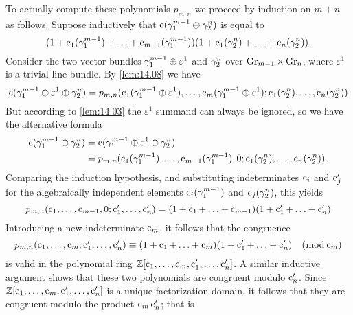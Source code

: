 \documentclass[../main]{subfiles}
\begin{document}
To actually compute these polynomials $p_{m, n}$ we proceed by induction on $m+n$ as follows. Suppose inductively that $\operatorname{c}(\gamma_{1}^{m-1} \oplus \gamma_{2}^{n})$ is equal to
\[
(1+\operatorname{c}_{1}(\gamma_{1}^{m-1})+\ldots+\operatorname{c}_{m-1}(\gamma_{1}^{m-1}))(1+\operatorname{c}_{1}(\gamma_{2}^{n})+\ldots+\operatorname{c}_{n}(\gamma_{2}^{n})) .
\]
Consider the two vector bundles $\gamma_{1}^{m-1} \oplus \varepsilon^{1}$ and $\gamma_{2}^{n}$ over $\operatorname{Gr}_{m-1} \times \operatorname{Gr}_{n}$, where $\varepsilon^{1}$ is a trivial line bundle. By \ref{lem:14.08} we have
\[\operatorname{c}(\gamma_{1}^{m-1} \oplus \varepsilon^{1} \oplus \gamma_{2}^{n})=p_{m, n}(\operatorname{c}_{1}(\gamma_{1}^{m-1} \oplus \varepsilon^{1}), \ldots, \operatorname{c}_{m}(\gamma_{1}^{m-1} \oplus \varepsilon^{1}) ; \operatorname{c}_{1}(\gamma_{2}^{n}), \ldots, \operatorname{c}_{n}(\gamma_{2}^{n}))\]
But according to \ref{lem:14.03} the $\varepsilon^{1}$ summand can always be ignored, so we have the alternative formula
\[
\begin{aligned}
\operatorname{c}(\gamma_{1}^{m-1} \oplus \gamma_{2}^{n}) &=\operatorname{c}(\gamma_{1}^{m-1} \oplus \varepsilon^{1} \oplus \gamma_{2}^{n}) \\
&=p_{m, n}(\operatorname{c}_{1}(\gamma_{1}^{m-1}), \ldots, \operatorname{c}_{m-1}(\gamma_{1}^{m-1}), 0 ; \operatorname{c}_{1}(\gamma_{2}^{n}), \ldots, \operatorname{c}_{n}(\gamma_{2}^{n})) .
\end{aligned}
\]
Comparing the induction hypothesis, and substituting indeterminates $\operatorname{c}_{i}$ and $\operatorname{c}_{j}^{\prime}$ for the algebraically independent elements $\operatorname{c}_{i}(\gamma_{1}^{m-1})$ and $\operatorname{c}_{j}(\gamma_{2}^{n})$, this yields
\[
p_{m, n}(\operatorname{c}_{1}, \ldots, \operatorname{c}_{m-1}, 0 ; \operatorname{c}_{1}^{\prime}, \ldots, \operatorname{c}_{n}^{\prime})=(1+\operatorname{c}_{1}+\ldots+\operatorname{c}_{m-1})(1+\operatorname{c}_{1}^{\prime}+\ldots+\operatorname{c}_{n}^{\prime})
\]
Introducing a new indeterminate $\operatorname{c}_{m}$, it follows that the congruence
\[p_{m, n}(\operatorname{c}_{1}, \ldots, \operatorname{c}_{m} ; \operatorname{c}_{1}^{\prime}, \ldots, \operatorname{c}_{n}^{\prime}) \equiv(1+\operatorname{c}_{1}+\ldots+\operatorname{c}_{m})(1+\operatorname{c}_{1}^{\prime}+\ldots+\operatorname{c}_{n}^{\prime}) \quad(\bmod \operatorname{c}_{m})\] is valid in the polynomial ring $\mathbb{Z}[\operatorname{c}_{1}, \ldots, \operatorname{c}_{m}, \operatorname{c}_{1}^{\prime}, \ldots, \operatorname{c}_{n}^{\prime}]$. A similar inductive argument shows that these two polynomials are congruent modulo $\operatorname{c}_{n}^{\prime}$. Since \newline $\mathbb{Z}[\operatorname{c}_{1}, \ldots, \operatorname{c}_{m}, \operatorname{c}_{1}^{\prime}, \ldots, \operatorname{c}_{n}^{\prime}]$ is a unique factorization domain, it follows that they are congruent modulo the product $\operatorname{c}_{m} \operatorname{c}_{n}^{\prime}$; that is
\end{document}
